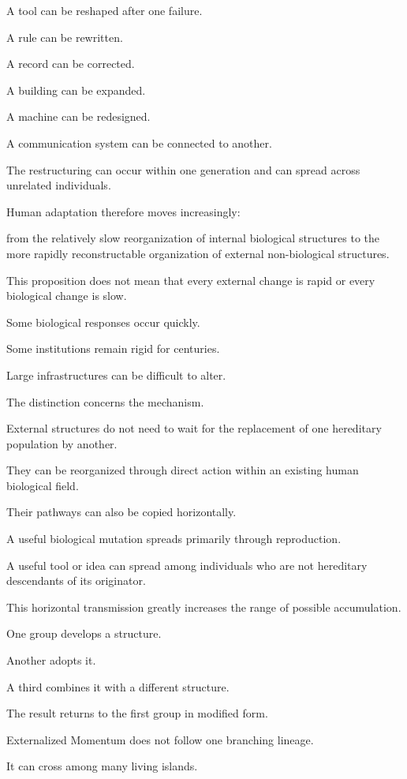 A tool can be reshaped after one failure.

A rule can be rewritten.

A record can be corrected.

A building can be expanded.

A machine can be redesigned.

A communication system can be connected to another.

The restructuring can occur within one generation and can spread across unrelated individuals.

Human adaptation therefore moves increasingly:

from the relatively slow reorganization of internal biological structures to the more rapidly reconstructable organization of external non-biological structures.

This proposition does not mean that every external change is rapid or every biological change is slow.

Some biological responses occur quickly.

Some institutions remain rigid for centuries.

Large infrastructures can be difficult to alter.

The distinction concerns the mechanism.

External structures do not need to wait for the replacement of one hereditary population by another.

They can be reorganized through direct action within an existing human biological field.

Their pathways can also be copied horizontally.

A useful biological mutation spreads primarily through reproduction.

A useful tool or idea can spread among individuals who are not hereditary descendants of its originator.

This horizontal transmission greatly increases the range of possible accumulation.

One group develops a structure.

Another adopts it.

A third combines it with a different structure.

The result returns to the first group in modified form.

Externalized Momentum does not follow one branching lineage.

It can cross among many living islands.


